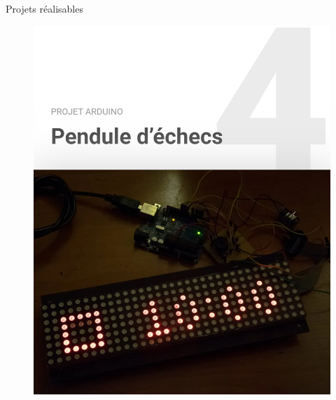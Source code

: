 \documentclass[]{beamer}
\begin{document}
	\begin{frame}
	{Projets réalisables}
			\begin{figure}
				\begin{center}
					\includegraphics[scale=0.4]{pendule_echec.png}
				\end{center}
			\end{figure}
	\end{frame}
\end{document}
